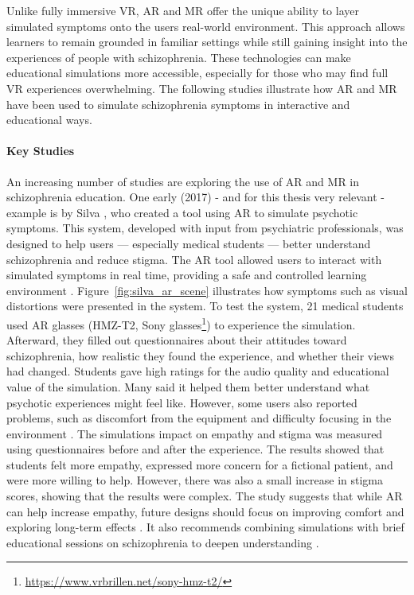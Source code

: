 Unlike fully immersive VR, AR and MR offer the unique ability to layer simulated symptoms onto the users real-world environment. This approach allows learners to remain grounded in familiar settings while still gaining insight into the experiences of people with schizophrenia. These technologies can make educational simulations more accessible, especially for those who may find full VR experiences overwhelming. The following studies illustrate how AR and MR have been used to simulate schizophrenia symptoms in interactive and educational ways.

\paragraph{Key Studies}
\label{sec:keystudies}

An increasing number of studies are exploring the use of AR and MR in schizophrenia education. One early (2017) - and for this thesis very relevant - example is by Silva \cite{Silva2017}, who created a tool using AR to simulate psychotic symptoms. This system, developed with input from psychiatric professionals, was designed to help users — especially medical students — better understand schizophrenia and reduce stigma. The AR tool allowed users to interact with simulated symptoms in real time, providing a safe and controlled learning environment \cite{Silva2017}. Figure~\ref{fig:silva_ar_scene} illustrates how symptoms such as visual distortions were presented in the system. To test the system, 21 medical students used AR glasses (HMZ-T2, Sony glasses\footnote{\url{https://www.vrbrillen.net/sony-hmz-t2/}}) to experience the simulation. Afterward, they filled out questionnaires about their attitudes toward schizophrenia, how realistic they found the experience, and whether their views had changed. Students gave high ratings for the audio quality and educational value of the simulation. Many said it helped them better understand what psychotic experiences might feel like. However, some users also reported problems, such as discomfort from the equipment and difficulty focusing in the environment \cite{Silva2017}. The simulations impact on empathy and stigma was measured using questionnaires before and after the experience. The results showed that students felt more empathy, expressed more concern for a fictional patient, and were more willing to help. However, there was also a small increase in stigma scores, showing that the results were complex. The study suggests that while AR can help increase empathy, future designs should focus on improving comfort and exploring long-term effects \cite{Silva2017}. It also recommends combining simulations with brief educational sessions on schizophrenia to deepen understanding \cite{Silva2017}. 



